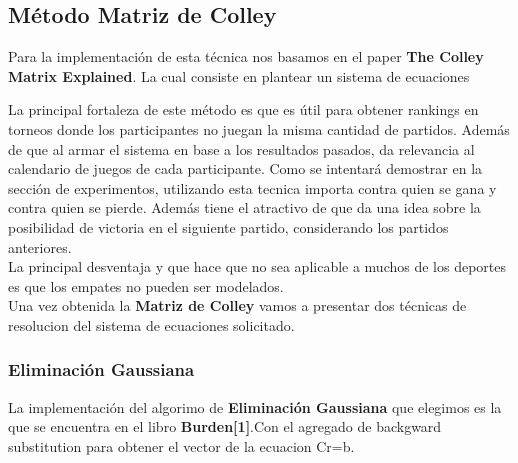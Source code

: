     


\subsection{Método Matriz de Colley}

Para la implementación de esta técnica nos basamos en el paper \textbf{The Colley Matrix Explained}. La cual consiste en plantear un sistema de ecuaciones

La principal fortaleza de este método es que es útil para obtener rankings en torneos donde los participantes no juegan la misma cantidad de partidos. Además de que al armar el sistema en base a los resultados pasados, da relevancia al calendario de juegos de cada participante. Como se intentará demostrar en la sección de experimentos, utilizando esta tecnica importa contra quien se gana y contra quien se pierde. Además tiene el atractivo de que da una idea sobre la posibilidad de victoria en el siguiente partido, considerando los partidos anteriores. \\

La principal desventaja y que hace que no sea aplicable a muchos de los deportes es que los empates no pueden ser modelados. \\

Una vez obtenida la \textbf{Matriz de Colley} vamos a  presentar dos técnicas de resolucion del sistema de ecuaciones solicitado. \\

\subsubsection{Eliminación Gaussiana}
La implementación del algorimo de \textbf{Eliminación Gaussiana} que elegimos es la que se encuentra en el libro \textbf{Burden[1]}.Con el agregado de backgward substitution para obtener el vector de la ecuacion Cr=b.

